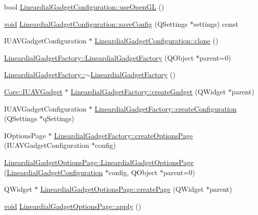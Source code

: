 \begin{DoxyCompactItemize}
\item 
bool \hyperlink{group___linear_dial_plugin_ga74595eab1c81ed96361010ba7f770bd1}{\-Lineardial\-Gadget\-Configuration\-::use\-Open\-G\-L} ()
\item 
\hyperlink{group___u_a_v_objects_plugin_ga444cf2ff3f0ecbe028adce838d373f5c}{void} \hyperlink{group___linear_dial_plugin_ga09129321da61b2494dca4ceafa18b996}{\-Lineardial\-Gadget\-Configuration\-::save\-Config} (\-Q\-Settings $\ast$settings) const 
\item 
\-I\-U\-A\-V\-Gadget\-Configuration $\ast$ \hyperlink{group___linear_dial_plugin_ga4b5d2c9802ec3b863732d6f707a1befe}{\-Lineardial\-Gadget\-Configuration\-::clone} ()
\item 
\hyperlink{group___linear_dial_plugin_ga65f46ec9f31c70119c149accc51b304e}{\-Lineardial\-Gadget\-Factory\-::\-Lineardial\-Gadget\-Factory} (\-Q\-Object $\ast$parent=0)
\item 
\hyperlink{group___linear_dial_plugin_ga85102065ae14d80cf83202637c76b94c}{\-Lineardial\-Gadget\-Factory\-::$\sim$\-Lineardial\-Gadget\-Factory} ()
\item 
\hyperlink{class_core_1_1_i_u_a_v_gadget}{\-Core\-::\-I\-U\-A\-V\-Gadget} $\ast$ \hyperlink{group___linear_dial_plugin_gad0365f5bab013eac15acf924e0bc2821}{\-Lineardial\-Gadget\-Factory\-::create\-Gadget} (\-Q\-Widget $\ast$parent)
\item 
\-I\-U\-A\-V\-Gadget\-Configuration $\ast$ \hyperlink{group___linear_dial_plugin_ga280a4a9d168f6d6b477c30630fdb128b}{\-Lineardial\-Gadget\-Factory\-::create\-Configuration} (\-Q\-Settings $\ast$q\-Settings)
\item 
\-I\-Options\-Page $\ast$ \hyperlink{group___linear_dial_plugin_gab8b7a7edac05d576e192c715acf48a22}{\-Lineardial\-Gadget\-Factory\-::create\-Options\-Page} (\-I\-U\-A\-V\-Gadget\-Configuration $\ast$config)
\item 
\hyperlink{group___linear_dial_plugin_gaa49909f8404b5303882872f6bb8ccdb2}{\-Lineardial\-Gadget\-Options\-Page\-::\-Lineardial\-Gadget\-Options\-Page} (\hyperlink{class_lineardial_gadget_configuration}{\-Lineardial\-Gadget\-Configuration} $\ast$config, \-Q\-Object $\ast$parent=0)
\item 
\-Q\-Widget $\ast$ \hyperlink{group___linear_dial_plugin_ga7498a19341fff9fe87afe47efb379a00}{\-Lineardial\-Gadget\-Options\-Page\-::create\-Page} (\-Q\-Widget $\ast$parent)
\item 
\hyperlink{group___u_a_v_objects_plugin_ga444cf2ff3f0ecbe028adce838d373f5c}{void} \hyperlink{group___linear_dial_plugin_gace7e2623dbc910a445c0f4f772fb85cb}{\-Lineardial\-Gadget\-Options\-Page\-::apply} ()

\end{DoxyCompactItemize}
